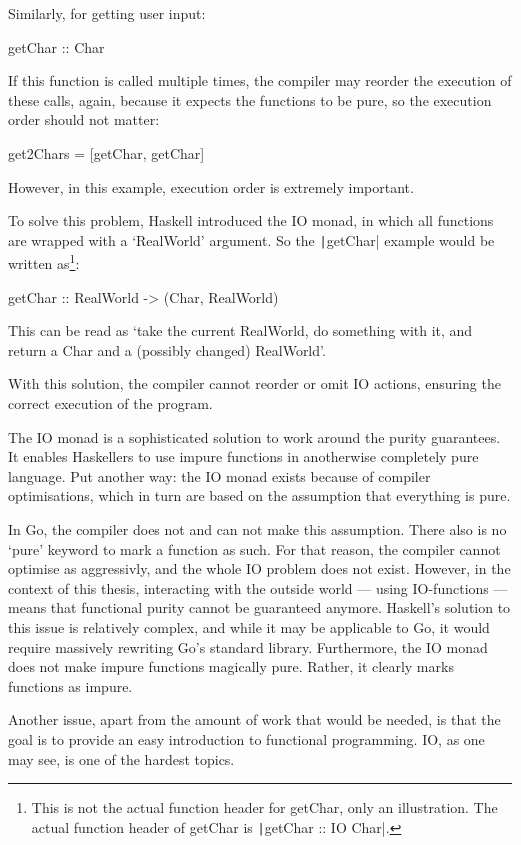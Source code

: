 Similarly, for getting user input:
\begin{haskellcode}
getChar :: Char
\end{haskellcode}
If this function is called multiple times, the compiler may reorder the
execution of these calls, again, because it expects the functions to be
pure, so the execution order should not matter:
\begin{haskellcode}
get2Chars = [getChar, getChar]
\end{haskellcode}
However, in this example, execution order is extremely important.

To solve this problem, Haskell introduced the IO monad, in which
all functions are wrapped with a `RealWorld' argument. So the
\texttt|getChar| example would be written as\footnote{
	This is not the actual function header for getChar, only an illustration.
	The actual function header of getChar is \texttt|getChar :: IO Char|.
}:

\begin{haskellcode}
getChar :: RealWorld -> (Char, RealWorld)
\end{haskellcode}
This can be read as `take the current RealWorld, do something with it,
and return a Char and a (possibly changed) RealWorld'\autocite{haskell-io}.

With this solution, the compiler cannot reorder or omit IO actions, ensuring
the correct execution of the program.

The IO monad is a sophisticated solution to work around the purity guarantees.
It enables Haskellers to use impure functions in anotherwise completely pure language.
Put another way: the IO monad exists because of compiler optimisations, which in turn are
based on the assumption that everything is pure.

In Go, the compiler does not and can not make this assumption. There also
is no `pure' keyword to mark a function as such. For that reason, the
compiler cannot optimise as aggressivly, and the whole IO problem does
not exist. However, in the context of this thesis, interacting with the outside world ---
using IO-functions --- means that functional purity cannot be guaranteed anymore.
Haskell's solution to this issue is relatively complex, and while it may be applicable
to Go, it would require massively rewriting Go's standard library. Furthermore,
the IO monad does not make impure functions magically pure. Rather, it
clearly marks functions as impure.

Another issue, apart from the amount of work that would be needed, is that
the goal is to provide an easy introduction to functional programming.
IO, as one may see, is one of the hardest topics.

